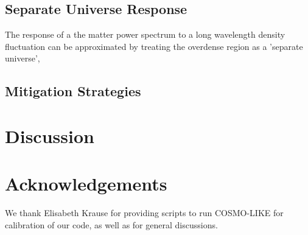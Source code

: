 \documentclass[a4paper,11pt]{article}
\begin{document}
\subsection{Separate Universe Response}
The response of a the matter power spectrum to a long wavelength density fluctuation can be approximated by treating the overdense region as a 'separate universe', \cite{chiang_response}\cite{baldauf_response}


\subsection{Mitigation Strategies}
\section{Discussion} 

\section{Acknowledgements} 
We thank Elisabeth Krause for providing scripts to run COSMO-LIKE for calibration of our code, as well as for general discussions. 





\appendix 
\end{document}
